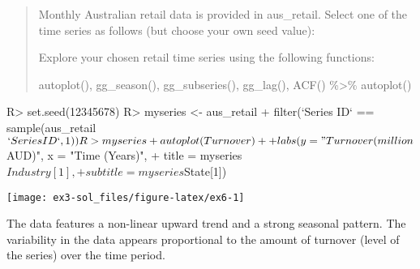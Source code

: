 \documentclass[
]{article}
\newenvironment{Shaded}{\begin{snugshade}}{\end{snugshade}}
\newcommand{\AttributeTok}[1]{\textcolor[rgb]{0.77,0.63,0.00}{#1}}
\newcommand{\DecValTok}[1]{\textcolor[rgb]{0.00,0.00,0.81}{#1}}
\newcommand{\FunctionTok}[1]{\textcolor[rgb]{0.00,0.00,0.00}{#1}}
\newcommand{\NormalTok}[1]{#1}
\newcommand{\OtherTok}[1]{\textcolor[rgb]{0.56,0.35,0.01}{#1}}
\newcommand{\SpecialCharTok}[1]{\textcolor[rgb]{0.00,0.00,0.00}{#1}}
\newcommand{\StringTok}[1]{\textcolor[rgb]{0.31,0.60,0.02}{#1}}
\begin{document}
\begin{quote}
Monthly Australian retail data is provided in aus\_retail. Select one of the time series as follows (but choose your own seed value):

\begin{Shaded}
\end{Shaded}

Explore your chosen retail time series using the following functions:

\begin{Shaded}
\begin{Highlighting}[]
\FunctionTok{autoplot}\NormalTok{(), }\FunctionTok{gg\_season}\NormalTok{(), }\FunctionTok{gg\_subseries}\NormalTok{(), }\FunctionTok{gg\_lag}\NormalTok{(), }\FunctionTok{ACF}\NormalTok{() }\SpecialCharTok{\%\textgreater{}\%} \FunctionTok{autoplot}\NormalTok{()}
\end{Highlighting}
\end{Shaded}
\end{quote}

\begin{CodeChunk}
\begin{CodeInput}
R> set.seed(12345678)
R> myseries <- aus_retail %
+   filter(`Series ID` == sample(aus_retail$`Series ID`,1))
R> myseries %
+   autoplot(Turnover) +
+   labs(y = "Turnover (million $AUD)", x = "Time (Years)",
+        title = myseries$Industry[1],
+        subtitle = myseries$State[1])
\end{CodeInput}


\begin{center}\texttt{[image: ex3-sol\_files/figure-latex/ex6-1]} \end{center}

\end{CodeChunk}

The data features a non-linear upward trend and a strong seasonal pattern. The variability in the data appears proportional to the amount of turnover (level of the series) over the time period.
\end{document}
